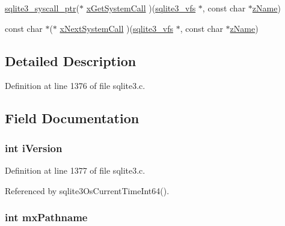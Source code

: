 \begin{DoxyCompactItemize}
\item 
\hyperlink{sqlite3_8h_a99a6393e96d7095fa024de9c1257aa6f}{sqlite3\+\_\+syscall\+\_\+ptr}($\ast$ \hyperlink{structsqlite3__vfs_a1a9847423eacc3a0b3f529bc6cef940e}{x\+Get\+System\+Call} )(\hyperlink{structsqlite3__vfs}{sqlite3\+\_\+vfs} $\ast$, const char $\ast$\hyperlink{structsqlite3__vfs_a58125535bc4b42100276f9f3390ffae0}{z\+Name})
\item 
const char $\ast$($\ast$ \hyperlink{structsqlite3__vfs_a6a0903c490980a85988acccc7c038a86}{x\+Next\+System\+Call} )(\hyperlink{structsqlite3__vfs}{sqlite3\+\_\+vfs} $\ast$, const char $\ast$\hyperlink{structsqlite3__vfs_a58125535bc4b42100276f9f3390ffae0}{z\+Name})
\end{DoxyCompactItemize}


\subsection{Detailed Description}


Definition at line 1376 of file sqlite3.\+c.



\subsection{Field Documentation}
\hypertarget{structsqlite3__vfs_a1138620d71393e6105389670719d9685}{}
\subsubsection[{i\+Version}]{\setlength{\rightskip}{0pt plus 5cm}int i\+Version}\label{structsqlite3__vfs_a1138620d71393e6105389670719d9685}


Definition at line 1377 of file sqlite3.\+c.



Referenced by sqlite3\+Os\+Current\+Time\+Int64().

\hypertarget{structsqlite3__vfs_a04df9f08eb19e4567ea3899f8a938d5c}{}
\subsubsection[{mx\+Pathname}]{\setlength{\rightskip}{0pt plus 5cm}int mx\+Pathname}\label{structsqlite3__vfs_a04df9f08eb19e4567ea3899f8a938d5c}


